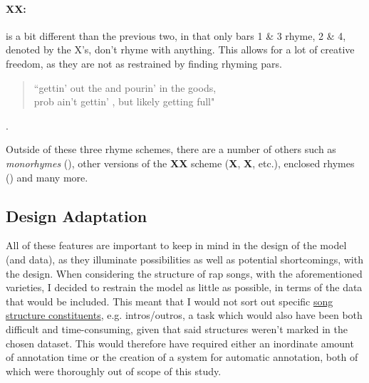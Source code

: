 \paragraph{\textbf{X}\textbf{X}:} is a bit different than the previous two, in that only bars 1 \& 3 rhyme, 2 \& 4, denoted by the X's, don't rhyme with anything. This allows for a lot of creative freedom, as they are not as restrained by finding rhyming pars. 

\begin{quote}\small{
    “gettin' out the  and pourin' in the goods,\\ prob ain't gettin' , but likely getting full"}
\end{quote}.

Outside of these three rhyme schemes, there are a number of others such as \textit{monorhymes} (), other versions of the \textbf{X}\textbf{X} scheme (\textbf{X}, \textbf{X}, etc.), enclosed rhymes () and many more.

\subsection{Design Adaptation}
\label{sec:design-adaptation}
All of these features are important to keep in mind in the design of the model (and data), as they illuminate possibilities as well as potential shortcomings, with the design. When considering the structure of rap songs, with the aforementioned varieties, I decided to restrain the model as little as possible, in terms of the data that would be included. This meant that I would not sort out specific \hyperref[para:song-structure]{song structure constituents}, e.g. intros/outros, a task which would also have been both difficult and time-consuming, given that said structures weren't marked in the chosen dataset. This would therefore have required either an inordinate amount of annotation time or the creation of a system for automatic annotation, both of which were thoroughly out of scope of this study.

